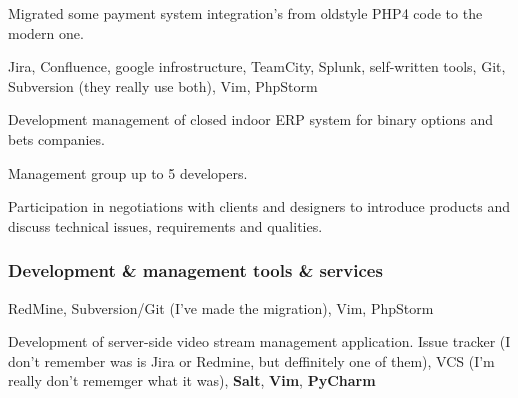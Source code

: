 \documentclass{cv}
\begin{document}
    \begin{gaas}
      \item Migrated some payment system integration's from oldstyle PHP4 code
        to the modern one.
    \end{gaas}
    \devtools
      Jira, Confluence, google infrostructure, TeamCity, Splunk, self-written
      tools, Git, Subversion (they really use both), Vim, PhpStorm

    \begin{gaas}
      \item Development management of closed indoor ERP system for binary
        options and bets companies.
      \item Management group up to 5 developers.
      \item Participation in negotiations with clients and designers to
        introduce products and discuss technical issues, requirements and
        qualities.
    \end{gaas}
    \devtools
    \subsubsection* {Development \& management tools \& services}
      RedMine, Subversion/Git (I've made the migration), Vim, PhpStorm

    \gaa
      Development of server-side video stream management application.
    \devtools
      Issue tracker (I don't remember was is Jira or Redmine, but deffinitely
      one of them), VCS (I'm really don't rememger what it was), \textbf{Salt},
      \textbf{Vim}, \textbf{PyCharm}
  \pagebreak
\end{document}
